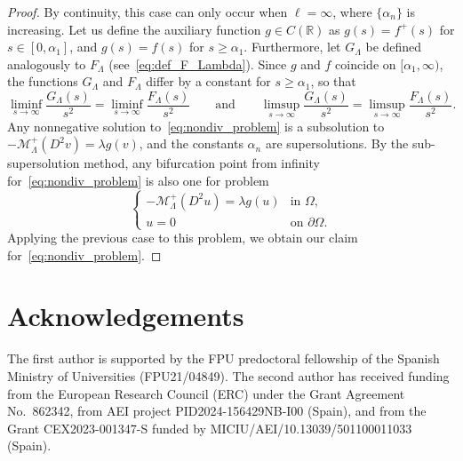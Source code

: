 \documentclass[10pt,twoside,english,reqno,a4paper]{amsart}
\theoremstyle{plain}
\theoremstyle{plain}
\theoremstyle{definition}
\theoremstyle{remark}
\numberwithin{equation}{section}
\newcommand{\R}{\mathbb{R}}
\begin{document}
\begin{proof}
By continuity, this case can only occur when $\ell=\infty$, where $\{\alpha_n\}$ is increasing. Let us define the auxiliary function $g\in C(\R)$ as $g(s) = f^+(s)$ for $s\in [0,\alpha_1]$, and $g(s) = f(s)$ for $s\geq \alpha_1$. Furthermore, let $G_\Lambda$ be defined analogously to $F_\Lambda$ (see~\eqref{eq:def_F_Lambda}). Since $g$ and $f$ coincide on $[\alpha_1,\infty)$, the functions $G_\Lambda$ and $F_\Lambda$ differ by a constant for $s\geq \alpha_1$, so that
\[
\liminf_{s\to \infty} \frac{G_\Lambda(s)}{s^2} = \liminf_{s\to \infty} \frac{F_\Lambda(s)}{s^2} \qquad \text{and} \qquad \limsup_{s\to \infty} \frac{G_\Lambda(s)}{s^2} = \limsup_{s\to \infty} \frac{F_\Lambda(s)}{s^2}.
\]
Any nonnegative solution to~\eqref{eq:nondiv_problem} is a subsolution to $-\mathcal{M}^+_\Lambda(D^2 v) = \lambda g(v)$, and the constants $\alpha_n$ are supersolutions. By the sub-supersolution method, any bifurcation point from infinity for~\eqref{eq:nondiv_problem} is also one for problem
\begin{equation*}
	\begin{cases}
		-\mathcal{M}^+_{\Lambda}(D^2u) = \lambda g(u) & \text{in } \Omega,\\
		u=0 & \text{on } \partial \Omega.
	\end{cases}
\end{equation*}
Applying the previous case to this problem, we obtain our claim for~\eqref{eq:nondiv_problem}.
\end{proof}



\section*{Acknowledgements}

The first author is supported by
the FPU predoctoral fellowship of the Spanish Ministry of Universities (FPU21/04849). The second author has received funding from the European Research Council (ERC) under the Grant Agreement No.\ 862342, from AEI project PID2024-156429NB-I00 (Spain), and from the Grant CEX2023-001347-S funded by MICIU/AEI/10.13039/501100011033 (Spain). 
\end{document}
